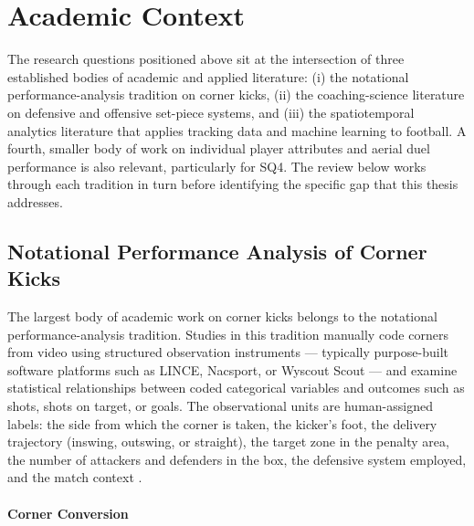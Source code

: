 
\chapter{Academic Context}
\label{sec:academic_context}
The research questions positioned above sit at the intersection of three
established bodies of academic and applied literature: (i) the notational
performance-analysis tradition on corner kicks, (ii) the coaching-science
literature on defensive and offensive set-piece systems, and (iii) the
spatiotemporal analytics literature that applies tracking data and machine
learning to football. A fourth, smaller body of work on individual player
attributes and aerial duel performance is also relevant, particularly for SQ4.
The review below works through each tradition in turn before identifying the
specific gap that this thesis addresses.

\section{Notational Performance Analysis of Corner Kicks}
\label{sec:lit_notational}

The largest body of academic work on corner kicks belongs to the notational
performance-analysis tradition. Studies in this tradition manually code corners
from video using structured observation instruments --- typically purpose-built
software platforms such as LINCE, Nacsport, or Wyscout Scout --- and examine
statistical relationships between coded categorical variables and outcomes such
as shots, shots on target, or goals. The observational units are human-assigned
labels: the side from which the corner is taken, the kicker's foot, the delivery
trajectory (inswing, outswing, or straight), the target zone in the penalty
area, the number of attackers and defenders in the box, the defensive system
employed, and the match context \citep{Sarmento2014, Sarmento2025}.

\subsubsection{Corner Conversion}

